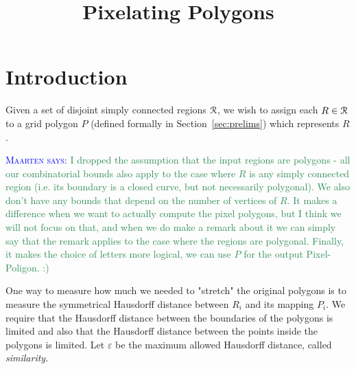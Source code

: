 \documentclass[a4paper,UKenglish,cleveref]{lipics-v2019}
\title{Pixelating Polygons}
\newcommand{\mremark}[3]{\textcolor{blue}{\textsc{#1 #2:}} \textcolor{SeaGreen}{\textsf{#3}}}
\newcommand{\maarten}[2][says]{\mremark{Maarten}{#1}{#2}}
\newcommand{\pix}{\square}
\newcommand{\eps}{\varepsilon}
\begin{document}
\maketitle

\section{Introduction}

Given a set of disjoint simply connected regions $\cal R$, we wish to assign each $R \in \cal R$ to a grid polygon $P$ (defined formally in Section~\ref {sec:prelims}) which represents $R$.

\maarten {I dropped the assumption that the input regions are polygons - all our combinatorial bounds also apply to the case where $R$ is any simply connected region (i.e. its boundary is a closed curve, but not necessarily polygonal). We also don't have any bounds that depend on the number of vertices of $R$. It makes a difference when we want to actually compute the pixel polygons, but I think we will not focus on that, and when we do make a remark about it we can simply say that the remark applies to the case where the regions are polygonal.  Finally, it makes the choice of letters more logical, we can use $P$ for the output Pixel-Poligon. :)}



One way to measure how much we needed to "stretch" the original polygons is to measure the symmetrical Hausdorff distance between $R_i$ and its mapping $P_i$.
We require that the Hausdorff distance between the boundaries of the polygons is limited and also that the Hausdorff distance between the points inside the polygons is limited.
Let $\eps$ be the maximum allowed Hausdorff distance, called \emph{similarity}.
\end{document}
